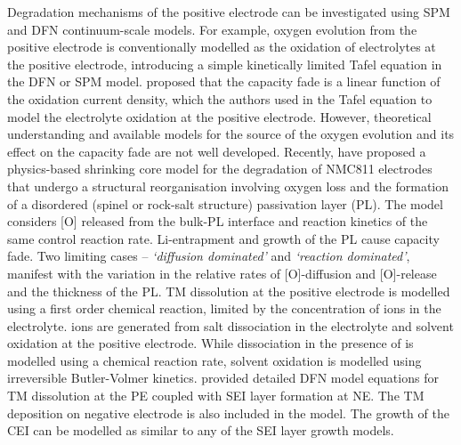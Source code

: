 \documentclass[journal=jacsat,manuscript=article]{achemso}
\begin{document}
Degradation mechanisms of the positive electrode can be investigated using SPM \cite{reniers2019review,jana2019physical} and DFN \cite{lin2013comprehensive} continuum-scale models. 
For example, oxygen evolution from the positive electrode is conventionally modelled as the oxidation of electrolytes at the positive electrode, introducing a simple kinetically limited Tafel equation \cite{lin2013comprehensive,reniers2019review} in the DFN or SPM model. 
\citeauthor{jana2019physical} proposed that the capacity fade is a linear function of the oxidation current density, which the authors used in the Tafel equation to model the electrolyte oxidation at the positive electrode.\cite{jana2019physical} 
However, theoretical understanding and available models for the source of the oxygen evolution and its effect on the capacity fade are not well developed. 
Recently, \citeauthor{ghosh2020shrinking} have proposed a physics-based shrinking core model for the degradation of NMC811 electrodes that undergo a structural reorganisation involving oxygen loss and the formation of a disordered (spinel or rock-salt structure) passivation layer (PL). \cite{ghosh2020shrinking} 
The model considers [O] released from the bulk-PL interface and reaction kinetics of the same control reaction rate. 
Li-entrapment and growth of the PL cause capacity fade. 
Two limiting cases – \textit{`diffusion dominated'} and \textit{`reaction dominated'}, manifest with the variation in the relative rates of [O]-diffusion and [O]-release and the thickness of the PL. 
TM dissolution at the positive electrode is modelled using a first order chemical reaction, limited by the concentration of  ions in the electrolyte. \cite{dai2012capacity} 
 ions are generated from  salt dissociation in the electrolyte and solvent oxidation at the positive electrode. 
While  dissociation in the presence of  is modelled using a chemical reaction rate, solvent oxidation is modelled using irreversible Butler-Volmer kinetics. \cite{dai2012capacity} 
\citeauthor{lin2013comprehensive} provided detailed DFN model equations for TM dissolution at the PE coupled with SEI layer formation at NE. \cite{lin2013comprehensive} 
The TM deposition on negative electrode is also included in the model. 
The growth of the CEI can be modelled as similar to any of the SEI layer growth models. 
\end{document}
